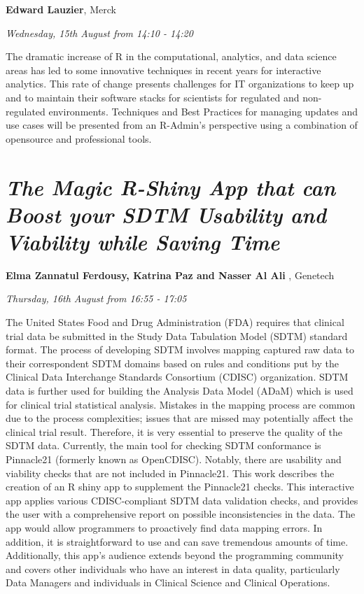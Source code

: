 \documentclass[]{book}
\theoremstyle{definition}
\theoremstyle{definition}
\theoremstyle{definition}
\theoremstyle{remark}
\begin{document}
\textbf{Edward Lauzier}, Merck

\emph{Wednesday, 15th August from 14:10 - 14:20}

The dramatic increase of R in the computational, analytics, and data
science areas has led to some innovative techniques in recent years for
interactive analytics. This rate of change presents challenges for IT
organizations to keep up and to maintain their software stacks for
scientists for regulated and non-regulated environments. Techniques and
Best Practices for managing updates and use cases will be presented from
an R-Admin's perspective using a combination of opensource and
professional tools.

\hypertarget{the-magic-r-shiny-app-that-can-boost-your-sdtm-usability-and-viability-while-saving-time}{%
\section{\texorpdfstring{\emph{The Magic R-Shiny App that can Boost your
SDTM Usability and Viability while Saving
Time}}{The Magic R-Shiny App that can Boost your SDTM Usability and Viability while Saving Time}}\label{the-magic-r-shiny-app-that-can-boost-your-sdtm-usability-and-viability-while-saving-time}}

\textbf{Elma Zannatul Ferdousy, Katrina Paz and Nasser Al Ali },
Genetech

\emph{Thursday, 16th August from 16:55 - 17:05}

The United States Food and Drug Administration (FDA) requires that
clinical trial data be submitted in the Study Data Tabulation Model
(SDTM) standard format. The process of developing SDTM involves mapping
captured raw data to their correspondent SDTM domains based on rules and
conditions put by the Clinical Data Interchange Standards Consortium
(CDISC) organization. SDTM data is further used for building the
Analysis Data Model (ADaM) which is used for clinical trial statistical
analysis. Mistakes in the mapping process are common due to the process
complexities; issues that are missed may potentially affect the clinical
trial result. Therefore, it is very essential to preserve the quality of
the SDTM data. Currently, the main tool for checking SDTM conformance is
Pinnacle21 (formerly known as OpenCDISC). Notably, there are usability
and viability checks that are not included in Pinnacle21. This work
describes the creation of an R shiny app to supplement the Pinnacle21
checks. This interactive app applies various CDISC-compliant SDTM data
validation checks, and provides the user with a comprehensive report on
possible inconsistencies in the data. The app would allow programmers to
proactively find data mapping errors. In addition, it is straightforward
to use and can save tremendous amounts of time. Additionally, this app's
audience extends beyond the programming community and covers other
individuals who have an interest in data quality, particularly Data
Managers and individuals in Clinical Science and Clinical Operations.
\end{document}
